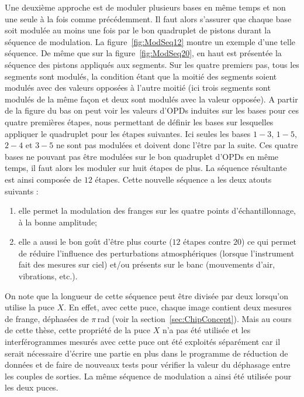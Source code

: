 Une deuxième approche est de moduler plusieurs bases en même temps et non une seule à la fois comme précédemment. Il faut alors s'assurer que chaque base soit modulée au moins une fois par le bon quadruplet de pistons durant la séquence de modulation. La figure~\ref{fig:ModSeq12} montre un exemple d'une telle séquence. De même que sur la figure~\ref{fig:ModSeq20}, en haut est présentée la séquence des pistons appliqués aux segments. Sur les quatre premiers pas, tous les segments sont modulés, la condition étant que la moitié des segments soient modulés avec des valeurs opposées à l'autre moitié (ici trois segments sont modulés de la même façon et deux sont modulés avec la valeur opposée). A partir de la figure du bas on peut voir les valeurs d'\ac{OPD}s induites sur les bases pour ces quatre premières étapes, nous permettant de définir les bases sur lesquelles appliquer le quadruplet pour les étapes suivantes. Ici seules les bases $1-3$, $1-5$, $2-4$ et $3-5$ ne sont pas modulées et doivent donc l'être par la suite. Ces quatre bases ne pouvant pas être modulées sur le bon quadruplet d'\ac{OPD}s en même temps, il faut alors les moduler sur huit étapes de plus. La séquence résultante est ainsi composée de $12$ étapes. Cette nouvelle séquence a les deux atouts suivants :

\begin{enumerate}
    \item elle permet la modulation des franges sur les quatre points d'échantillonnage, à la bonne amplitude;
    \item elle a aussi le bon goût d'être plus courte ($12$ étapes contre $20$) ce qui permet de réduire l'influence des perturbations atmosphériques (lorsque l'instrument fait des mesures sur ciel) et/ou présents sur le banc (mouvements d'air, vibrations, etc.).
\end{enumerate}

On note que la longueur de cette séquence peut être divisée par deux lorsqu'on utilise la puce $X$. En effet, avec cette puce, chaque image contient deux mesures de frange, déphasées de $\pi \,$rad (voir la section~\ref{sec:ChipConcept}). Mais au cours de cette thèse, cette propriété de la puce $X$ n'a pas été utilisée et les interférogrammes mesurés avec cette puce ont été exploités séparément car il serait nécessaire d'écrire une partie en plus dans le programme de réduction de données et de faire de nouveaux tests pour vérifier la valeur du déphasage entre les couples de sorties. La même séquence de modulation a ainsi été utilisée pour les deux puces.

